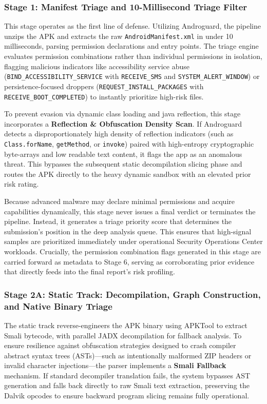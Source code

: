 \documentclass[10pt,a4paper]{article}
\begin{document}
\subsubsection*{Stage 1: Manifest Triage and 10-Millisecond Triage Filter}

This stage operates as the first line of defense. Utilizing Androguard, the pipeline unzips the APK and extracts the raw \texttt{AndroidManifest.xml} in under 10 milliseconds, parsing permission declarations and entry points. The triage engine evaluates permission combinations rather than individual permissions in isolation, flagging malicious indicators like accessibility service abuse (\texttt{BIND\_ACCESSIBILITY\_SERVICE} with \texttt{RECEIVE\_SMS} and \texttt{SYSTEM\_ALERT\_WINDOW}) or persistence-focused droppers (\texttt{REQUEST\_INSTALL\_PACKAGES} with \texttt{RECEIVE\_BOOT\_COMPLETED}) to instantly prioritize high-risk files.

To prevent evasion via dynamic class loading and java reflection, this stage incorporates a \textbf{Reflection \& Obfuscation Density Scan}. If Androguard detects a disproportionately high density of reflection indicators (such as \texttt{Class.forName}, \texttt{getMethod}, or \texttt{invoke}) paired with high-entropy cryptographic byte-arrays and low readable text content, it flags the app as an anomalous threat. This bypasses the subsequent static decompilation slicing phase and routes the APK directly to the heavy dynamic sandbox with an elevated prior risk rating.

Because advanced malware may declare minimal permissions and acquire capabilities dynamically, this stage never issues a final verdict or terminates the pipeline. Instead, it generates a triage priority score that determines the submission's position in the deep analysis queue. This ensures that high-signal samples are prioritized immediately under operational Security Operations Center workloads. Crucially, the permission combination flags generated in this stage are carried forward as metadata to Stage 6, serving as corroborating prior evidence that directly feeds into the final report's risk profiling.

\subsubsection*{Stage 2A: Static Track: Decompilation, Graph Construction, and Native Binary Triage}

The static track reverse-engineers the APK binary using APKTool to extract Smali bytecode, with parallel JADX decompilation for fallback analysis. To ensure resilience against obfuscation strategies designed to crash compiler abstract syntax trees (ASTs)—such as intentionally malformed ZIP headers or invalid character injections—the parser implements a \textbf{Smali Fallback} mechanism. If standard decompiler translation fails, the system bypasses AST generation and falls back directly to raw Smali text extraction, preserving the Dalvik opcodes to ensure backward program slicing remains fully operational.
\end{document}
